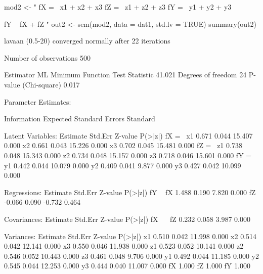 \begin{Schunk}
\begin{Sinput}
 mod2 <- "
 fX =~ x1 + x2 + x3
 fZ =~ z1 + z2 + z3
 fY =~ y1 + y2 + y3
 
 fY ~ fX + fZ
 "
 out2 <- sem(mod2, data = dat1, std.lv = TRUE)
 summary(out2)
\end{Sinput}
\begin{Soutput}
lavaan (0.5-20) converged normally after  22 iterations

  Number of observations                           500

  Estimator                                         ML
  Minimum Function Test Statistic               41.021
  Degrees of freedom                                24
  P-value (Chi-square)                           0.017

Parameter Estimates:

  Information                                 Expected
  Standard Errors                             Standard

Latent Variables:
                   Estimate  Std.Err  Z-value  P(>|z|)
  fX =~                                               
    x1                0.671    0.044   15.407    0.000
    x2                0.661    0.043   15.226    0.000
    x3                0.702    0.045   15.481    0.000
  fZ =~                                               
    z1                0.738    0.048   15.343    0.000
    z2                0.734    0.048   15.157    0.000
    z3                0.718    0.046   15.601    0.000
  fY =~                                               
    y1                0.442    0.044   10.079    0.000
    y2                0.409    0.041    9.877    0.000
    y3                0.427    0.042   10.099    0.000

Regressions:
                   Estimate  Std.Err  Z-value  P(>|z|)
  fY ~                                                
    fX                1.488    0.190    7.820    0.000
    fZ               -0.066    0.090   -0.732    0.464

Covariances:
                   Estimate  Std.Err  Z-value  P(>|z|)
  fX ~~                                               
    fZ                0.232    0.058    3.987    0.000

Variances:
                   Estimate  Std.Err  Z-value  P(>|z|)
    x1                0.510    0.042   11.998    0.000
    x2                0.514    0.042   12.141    0.000
    x3                0.550    0.046   11.938    0.000
    z1                0.523    0.052   10.141    0.000
    z2                0.546    0.052   10.443    0.000
    z3                0.461    0.048    9.706    0.000
    y1                0.492    0.044   11.185    0.000
    y2                0.545    0.044   12.253    0.000
    y3                0.444    0.040   11.007    0.000
    fX                1.000                           
    fZ                1.000                           
    fY                1.000                           
\end{Soutput}
\end{Schunk}
